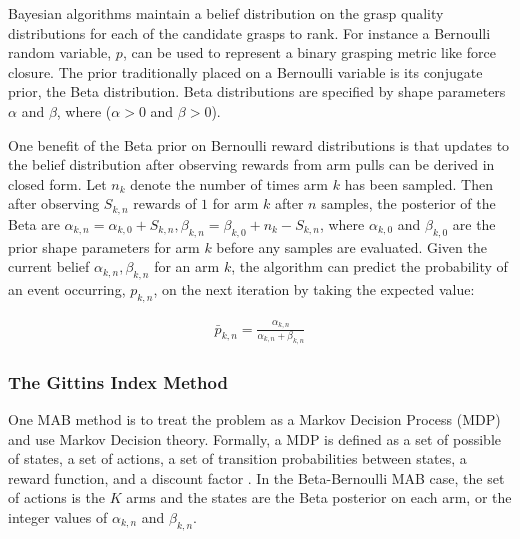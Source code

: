 \documentclass[10pt, conference]{ieeeconf}      %
\begin{document}
Bayesian algorithms maintain a belief distribution on the grasp quality distributions for each of the candidate grasps to rank. For instance a Bernoulli random variable, $p$, can be used to represent a binary grasping metric like force closure. The prior traditionally placed on a Bernoulli variable is its conjugate prior, the Beta distribution. 
Beta distributions are specified by shape parameters $\alpha$ and $\beta$, where ($\alpha >0$ and $\beta >0$).


One benefit of the Beta prior on Bernoulli reward distributions is that updates to the belief distribution after observing rewards from arm pulls can be derived in closed form.
Let $n_k$ denote the number of times arm $k$ has been sampled.
Then after observing $S_{k,n}$ rewards of $1$ for arm $k$ after $n$ samples, the posterior of the Beta are $\alpha_{k, n} = \alpha_{k, 0} + S_{k,n}, \beta_{k, n} = \beta_{k, 0} + n_k - S_{k,n}$, where $\alpha_{k,0}$ and $\beta_{k,0}$ are the prior shape parameters for arm $k$ before any samples are evaluated.
Given the current belief $\alpha_{k, n}, \beta_{k, n}$ for an arm $k$, the algorithm can predict the probability of an event occurring, $p_{k,n}$, on the next iteration by taking the expected value:

\vspace{-2ex}
\begin{align}\label{eq:shape_sampling}
\bar{p}_{k,n} = \frac{\alpha_{k,n}}{\alpha_{k,n} + \beta_{k,n}}
\end{align}





\subsubsection{The Gittins Index Method} 
One MAB method is to treat the problem as a Markov Decision Process (MDP) and use Markov Decision theory.
Formally, a MDP is defined as a set of possible of states, a set of actions, a set of transition probabilities between states, a reward function, and a discount factor \cite{barto1998reinforcement}.
In the Beta-Bernoulli MAB case, the set of actions is the $K$ arms and the states are the Beta posterior on each arm, or the integer values of $\alpha_{k,n}$ and $\beta_{k,n}$. 
\end{document}
